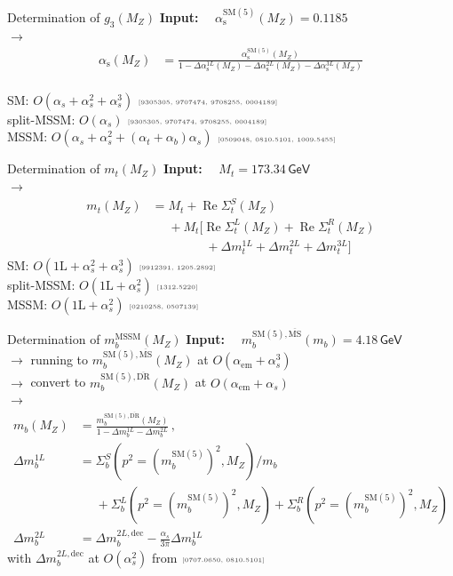 \documentclass[hyperref={pdfpagelabels=false},ngerman]{beamer}
\newcommand{\eh}[1]{\,\mathsf{#1}}
\newcommand{\mycite}[1]{\ensuremath{\text{\textcolor{darkgray}{\tiny [#1]}}}}
\DeclareMathOperator{\re}{Re}
\renewcommand{\emph}{\textbf}
\newcommand{\DRbar}{\ensuremath{\overline{\text{DR}}}}
\newcommand{\MSbar}{\ensuremath{\overline{\text{MS}}}}
\newcommand{\SM}{\ensuremath{\text{SM}}}
\newcommand{\MSSM}{\ensuremath{\text{MSSM}}}
\newcommand{\at}{\alpha_t}
\newcommand{\ab}{\alpha_b}
\newcommand{\as}{\alpha_s}
\newcommand{\aem}{\alpha_\text{em}}
\begin{document}
\begin{frame}[noframenumbering]{Determination of $g_3(M_Z)$}
  \emph{Input:} \ \ $\alpha_{\text{s}}^{\SM(5)}(M_Z) = 0.1185$\\[1em]
  $\rightarrow$
  \begin{align*}
    \alpha_{\text{s}}(M_Z) &=
    \frac{\alpha_{\text{s}}^{\SM(5)}(M_Z)}{1
      - \Delta\alpha_{\text{s}}^{1L}(M_Z)
      - \Delta\alpha_{\text{s}}^{2L}(M_Z)
      - \Delta\alpha_{\text{s}}^{3L}(M_Z)
    }
  \end{align*}
  \\\vspace{2em}
  SM: $O(\as + \as^2 + \as^3)$ \mycite{9305305, 9707474, 9708255, 0004189}\\
  split-MSSM: $O(\as)$ \mycite{9305305, 9707474, 9708255, 0004189}\\
  MSSM: $O(\as + \as^2 + (\at + \ab)\as)$ \mycite{0509048, 0810.5101, 1009.5455}
\end{frame}

\begin{frame}[noframenumbering]{Determination of $m_t(M_Z)$}
  \emph{Input:} \ \ $M_t = 173.34\eh{GeV}$\\[1em]
  $\rightarrow$
  \begin{align*}
    m_{t}(M_Z) &= M_t +
    \re\Sigma_{t}^{S}(M_Z) \\
    &\phantom{={}} + M_t \Big[ \re\Sigma_{t}^{L}(M_Z) +
    \re\Sigma_{t}^{R}(M_Z) \\
    &\phantom{={}} \qquad\quad
      + \Delta m_t^{1L} + \Delta m_t^{2L} + \Delta m_t^{3L} \Big]
  \end{align*}
  SM: $O(\text{1L} + \as^2 + \as^3)$ \mycite{9912391, 1205.2892} \\
  split-MSSM: $O(\text{1L} + \as^2)$ \mycite{1312.5220}\\
  MSSM: $O(\text{1L} + \as^2)$ \mycite{0210258, 0507139}
\end{frame}

\begin{frame}[noframenumbering]{Determination of $m_b^{\MSSM}(M_Z)$}
  \emph{Input:} \ \ $m_b^{\SM(5),\MSbar}(m_b) = 4.18\eh{GeV}$\\[1em]
  $\rightarrow$ running to $m_b^{\SM(5),\MSbar}(M_Z)$ at $O(\aem + \as^3)$\\[1em]
  $\rightarrow$ convert to $m_b^{\SM(5),\DRbar}(M_Z)$ at $O(\aem + \as)$\\[1em]
  $\rightarrow$
  \begin{align*}
    m_b(M_Z) &= \frac{m_b^{\SM(5),\DRbar}(M_Z)}{1 - \Delta m_b^{1L} - \Delta m_b^{2L}} \,, \\
    \Delta m_b^{1L} &= \Sigma_{b}^S(p^2=(m_b^{\SM(5)})^2,M_Z)/m_b\\
           &\phantom{={}}+ \Sigma_{b}^L(p^2=(m_b^{\SM(5)})^2,M_Z)
             + \Sigma_{b}^R(p^2=(m_b^{\SM(5)})^2,M_Z)\\
    \Delta m_b^{2L} &= \Delta m_b^{2L,\text{dec}} - \frac{\as}{3\pi}\Delta m_b^{1L}
  \end{align*}
  with $\Delta m_b^{2L,\text{dec}}$ at $O(\as^2)$ from \mycite{0707.0650, 0810.5101}
\end{frame}
\end{document}

